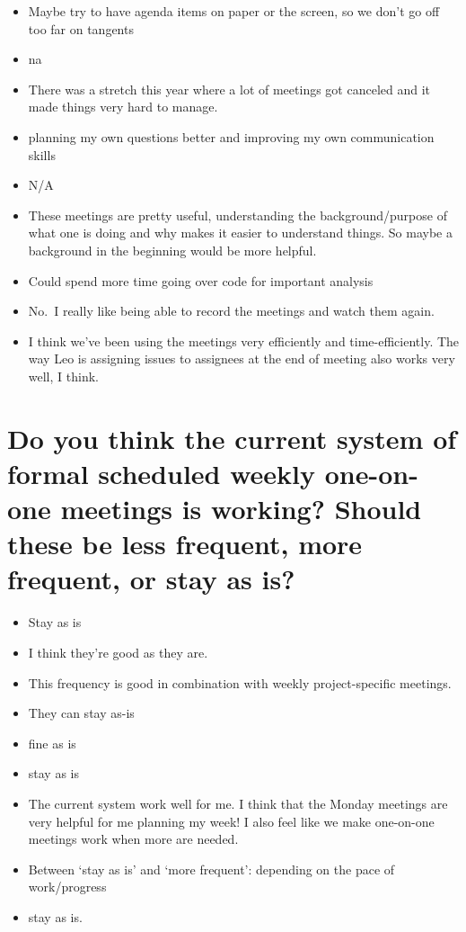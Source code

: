 \documentclass[
]{book}
\providecommand{\tightlist}{%
  \setlength{\itemsep}{0pt}\setlength{\parskip}{0pt}}
\begin{document}
\begin{itemize}
\tightlist
\item
  Maybe try to have agenda items on paper or the screen, so we don't go off too far on tangents
\item
  na
\item
  There was a stretch this year where a lot of meetings got canceled and it made things very hard to manage.
\item
  planning my own questions better and improving my own communication skills
\item
  N/A
\item
  These meetings are pretty useful, understanding the background/purpose of what one is doing and why makes it easier to understand things. So maybe a background in the beginning would be more helpful.
\item
  Could spend more time going over code for important analysis
\item
  No.~I really like being able to record the meetings and watch them again.
\item
  I think we've been using the meetings very efficiently and time-efficiently. The way Leo is assigning issues to assignees at the end of meeting also works very well, I think.
\end{itemize}

\hypertarget{do-you-think-the-current-system-of-formal-scheduled-weekly-one-on-one-meetings-is-working-should-these-be-less-frequent-more-frequent-or-stay-as-is}{%
\section{Do you think the current system of formal scheduled weekly one-on-one meetings is working? Should these be less frequent, more frequent, or stay as is?}\label{do-you-think-the-current-system-of-formal-scheduled-weekly-one-on-one-meetings-is-working-should-these-be-less-frequent-more-frequent-or-stay-as-is}}

\begin{itemize}
\tightlist
\item
  Stay as is
\item
  I think they're good as they are.
\item
  This frequency is good in combination with weekly project-specific meetings.
\item
  They can stay as-is
\item
  fine as is
\item
  stay as is
\item
  The current system work well for me. I think that the Monday meetings are very helpful for me planning my week! I also feel like we make one-on-one meetings work when more are needed.
\item
  Between `stay as is' and `more frequent': depending on the pace of work/progress
\item
  stay as is.
\end{itemize}
\end{document}

